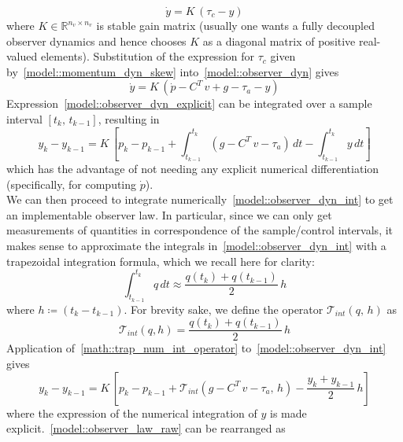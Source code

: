\documentclass[letterpaper, 10 pt, conference]{ieeeconf}  %
\begin{document}
\begin{equation}\label{model::observer_dyn}
\dot{y} = K\,\left(\tau_c - y\right)
\end{equation}
where $K\in \mathbb{R}^{n_v\times n_v}$ is stable gain matrix (usually one wants a fully decoupled observer dynamics and hence chooses $K$ as a diagonal matrix of positive real-valued elements).
Substitution of the expression for $\tau_c$ given by~\eqref{model::momentum_dyn_skew} into~\eqref{model::observer_dyn} gives
\begin{equation}\label{model::observer_dyn_explicit}
\dot{y} = K\,\left(\dot{p} - C^T\,v + g - \tau_a - y\right)
\end{equation}
Expression~\eqref{model::observer_dyn_explicit} can be integrated over a sample interval $\left[t_k,\,t_{k-1}\right]$, resulting in
\begin{dmath}\label{model::observer_dyn_int}
y_k - y_{k-1} = K\,\left[p_k - p_{k-1} + \int_{t_{k-1}}^{t_{k}}\left(g - C^T\,v - \tau_a\right)\,dt - \int_{t_{k-1}}^{t_{k}} y\,dt\right] 
\end{dmath}
which has the advantage of not needing any explicit numerical differentiation (specifically, for computing $\dot{p}$).\\
We can then proceed to integrate numerically~\eqref{model::observer_dyn_int} to get an implementable observer law. In particular, since we can only get measurements of quantities in correspondence of the sample/control intervals, it makes sense to approximate the integrals in~\eqref{model::observer_dyn_int} with a trapezoidal integration formula, which we recall here for clarity:
\begin{equation}\label{math::trap_num_int}
\int_{t_{k-1}}^{t_{k}} q\,dt\approx \dfrac{q(t_k) + q(t_{k - 1})}{2}\,h
\end{equation}
where $h\coloneqq\left(t_{k} - t_{k-1}\right)$.
For brevity sake, we define the operator $\mathcal{T}_{int}(q,\,h)$ as
\begin{equation}\label{math::trap_num_int_operator}
\mathcal{T}_{int}(q, h) = \dfrac{q(t_k) + q(t_{k - 1})}{2}\,h
\end{equation}
Application of~\eqref{math::trap_num_int_operator} to~\eqref{model::observer_dyn_int} gives 
\begin{dmath}\label{model::observer_law_raw}
	y_k - y_{k-1} = K\,\left[p_k - p_{k-1} + \mathcal{T}_{int}(g - C^T\,v - \tau_a,\,h) - \dfrac{y_k + y_{k-1}}{2}\,h \right]  
\end{dmath}
where the expression of the numerical integration of $y$ is made explicit.~\eqref{model::observer_law_raw} can be rearranged as
\end{document}
